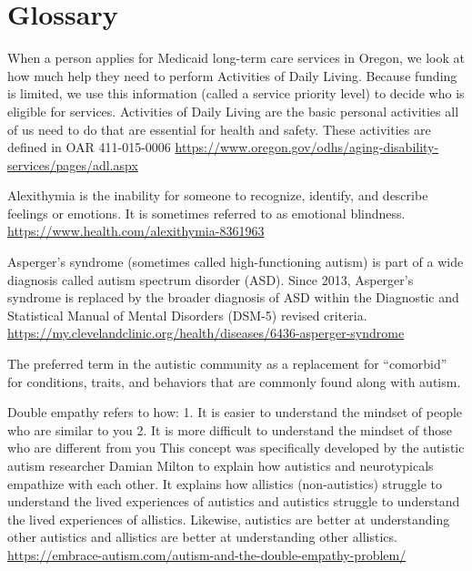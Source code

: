 \documentclass[
  letterpaper,
  DIV=11,
  numbers=noendperiod]{scrreprt}
\providecommand{\tightlist}{%
  \setlength{\itemsep}{0pt}\setlength{\parskip}{0pt}}\usepackage{longtable,booktabs,array}
\begin{document}
\chapter{Glossary}\label{sec-glossary}

\begin{description}
\tightlist
\item[ADLs]
When a person applies for Medicaid long-term care services in Oregon, we
look at how much help they need to perform Activities of Daily Living.
Because funding is limited, we use this information (called a service
priority level) to decide who is eligible for services. Activities of
Daily Living are the basic personal activities all of us need to do that
are essential for health and safety. These activities are defined in OAR
411-015-0006
\url{https://www.oregon.gov/odhs/aging-disability-services/pages/adl.aspx}
\item[Alexithymia]
Alexithymia is the inability for someone to recognize, identify, and
describe feelings or emotions. It is sometimes referred to as emotional
blindness. \url{https://www.health.com/alexithymia-8361963}
\item[Asperger's Syndrome]
Asperger's syndrome (sometimes called high-functioning autism) is part
of a wide diagnosis called autism spectrum disorder (ASD). Since 2013,
Asperger's syndrome is replaced by the broader diagnosis of ASD within
the Diagnostic and Statistical Manual of Mental Disorders (DSM-5)
revised criteria.
\url{https://my.clevelandclinic.org/health/diseases/6436-asperger-syndrome}
\item[Co-Occurring Conditions]
The preferred term in the autistic community as a replacement for
``comorbid'' for conditions, traits, and behaviors that are commonly
found along with autism.
\item[Double Empathy]
Double empathy refers to how: 1. It is easier to understand the mindset
of people who are similar to you 2. It is more difficult to understand
the mindset of those who are different from you This concept was
specifically developed by the autistic autism researcher Damian Milton
to explain how autistics and neurotypicals empathize with each other. It
explains how allistics (non-autistics) struggle to understand the lived
experiences of autistics and autistics struggle to understand the lived
experiences of allistics. Likewise, autistics are better at
understanding other autistics and allistics are better at understanding
other allistics.
\url{https://embrace-autism.com/autism-and-the-double-empathy-problem/}
\item[Dyslexia]

\end{description}
\end{document}
